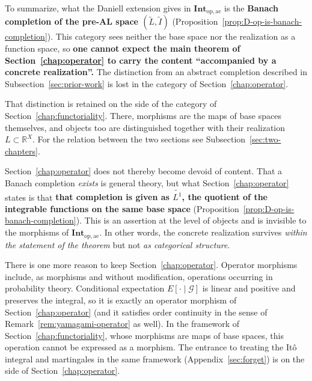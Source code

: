 \begin{remark}\label{rem:op-ae-is-banach-completion}
  To summarize, what the Daniell extension gives in
  $\mathbf{Int}_{\mathrm{op},\mathrm{ae}}$ is the \textbf{Banach completion of
  the pre-AL space $(\widetilde{L},\widetilde{I})$}
  (Proposition~\ref{prop:D-op-is-banach-completion}).
  This category sees neither the base space nor the realization as a function
  space, so \textbf{one cannot expect the main theorem of
  Section~\ref{chap:operator} to carry the content ``accompanied by a concrete
  realization''.}
  The distinction from an abstract completion described in
  Subsection~\ref{sec:prior-work} is lost in the category of
  Section~\ref{chap:operator}.

  That distinction is retained on the side of the category of
  Section~\ref{chap:functoriality}.
  There, morphisms are the maps of base spaces themselves, and objects too are
  distinguished together with their realization $L\subset\mathbb{R}^X$.
  For the relation between the two sections see
  Subsection~\ref{sec:two-chapters}.

  Section~\ref{chap:operator} does not thereby become devoid of content.
  That a Banach completion \emph{exists} is general theory, but what
  Section~\ref{chap:operator} states is that \textbf{that completion is given as
  $\widetilde{L^1}$, the quotient of the integrable functions on the same base
  space} (Proposition~\ref{prop:D-op-is-banach-completion}).
  This is an assertion at the level of objects and is invisible to the morphisms
  of $\mathbf{Int}_{\mathrm{op},\mathrm{ae}}$.
  In other words, the concrete realization survives \emph{within the statement
  of the theorem} but not \emph{as categorical structure}.

  There is one more reason to keep Section~\ref{chap:operator}.
  Operator morphisms include, as morphisms and without modification, operations
  occurring in probability theory.
  Conditional expectation $E[\cdot\mid\mathcal{G}]$ is linear and positive and
  preserves the integral, so it is exactly an operator morphism of
  Section~\ref{chap:operator} (and it satisfies order continuity in the sense of
  Remark~\ref{rem:yamagami-operator} as well).
  In the framework of Section~\ref{chap:functoriality}, whose morphisms are maps
  of base spaces, this operation cannot be expressed as a morphism.
  The entrance to treating the It\^o integral and martingales in the same
  framework (Appendix~\ref{sec:forget}) is on the side of
  Section~\ref{chap:operator}.
\end{remark}
